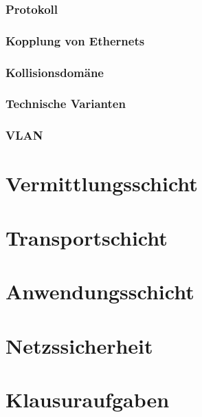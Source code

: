\documentclass[a4paper, 14pt]{article}
\begin{document}
	\subsubsection{Protokoll}

	\subsubsection{Kopplung von Ethernets}

	\subsubsection{Kollisionsdomäne}

	\subsubsection{Technische Varianten}

	\subsubsection{VLAN}

	\section{Vermittlungsschicht}

	\section{Transportschicht}

	\section{Anwendungsschicht}

	\section{Netzssicherheit}

	\section{Klausuraufgaben}
\end{document}
